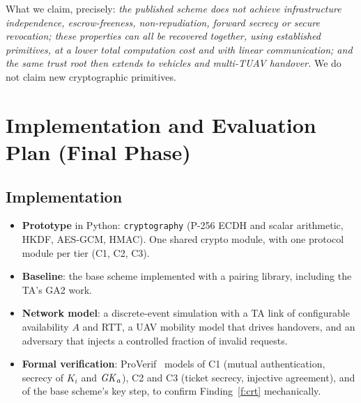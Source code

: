 \begin{keybox}
What we claim, precisely: \emph{the published scheme does not achieve infrastructure independence, escrow-freeness, non-repudiation, forward secrecy or secure revocation;
these properties can all be recovered together, using established primitives, at a lower total computation cost and with linear communication; and the same trust
root then extends to vehicles and multi-TUAV handover.} We do not claim new cryptographic primitives.
\end{keybox}

\section{Implementation and Evaluation Plan (Final Phase)}\label{sec:plan}
\subsection{Implementation}
\begin{itemize}
  \item \textbf{Prototype} in Python: \texttt{cryptography} (P-256 ECDH and scalar arithmetic, HKDF, AES-GCM, HMAC). One shared crypto module, with one protocol module per tier (C1, C2, C3).
  \item \textbf{Baseline}: the base scheme implemented with a pairing library, including the TA's GA2 work.
  \item \textbf{Network model}: a discrete-event simulation with a TA link of configurable availability $A$ and RTT, a UAV mobility model that drives handovers, and an adversary
        that injects a controlled fraction of invalid requests.
  \item \textbf{Formal verification}: ProVerif~\cite{proverif} models of C1 (mutual authentication, secrecy of $K_i$ and $\mathit{GK}_a$), C2 and C3 (ticket secrecy, injective agreement), and of
        the base scheme's key step, to confirm Finding~\ref{f:crt} mechanically.
\end{itemize}

